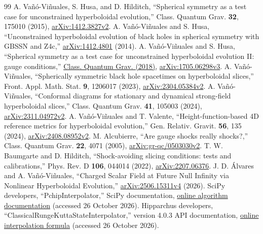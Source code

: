 \begin{thebibliography}{99}
A. Va\~n\'o-Vi\~nuales, S. Husa, and D. Hilditch,
``Spherical symmetry as a test case for unconstrained hyperboloidal evolution,''
Class. Quantum Grav. \textbf{32}, 175010 (2015),
\href{https://arxiv.org/abs/1412.3827v2}{arXiv:1412.3827v2}.
A. Va\~n\'o-Vi\~nuales and S. Husa,
``Unconstrained hyperboloidal evolution of black holes in spherical symmetry with GBSSN and Z4c,''
\href{https://arxiv.org/abs/1412.4801}{arXiv:1412.4801} (2014).
A. Va\~n\'o-Vi\~nuales and S. Husa,
``Spherical symmetry as a test case for unconstrained hyperboloidal evolution II: gauge conditions,''
\href{https://doi.org/10.1088/1361-6382/aaa4e2}{Class. Quantum Grav. (2018)},
\href{https://arxiv.org/abs/1705.06298v3}{arXiv:1705.06298v3}.
A. Va\~n\'o-Vi\~nuales,
``Spherically symmetric black hole spacetimes on hyperboloidal slices,''
Front. Appl. Math. Stat. \textbf{9}, 1206017 (2023),
\href{https://arxiv.org/abs/2304.05384v2}{arXiv:2304.05384v2}.
A. Va\~n\'o-Vi\~nuales,
``Conformal diagrams for stationary and dynamical strong-field hyperboloidal slices,''
Class. Quantum Grav. \textbf{41}, 105003 (2024),
\href{https://arxiv.org/abs/2311.04972v2}{arXiv:2311.04972v2}.
A. Va\~n\'o-Vi\~nuales and T. Valente,
``Height-function-based 4D reference metrics for hyperboloidal evolution,''
Gen. Relativ. Gravit. \textbf{56}, 135 (2024),
\href{https://arxiv.org/abs/2408.08952v2}{arXiv:2408.08952v2}.
M. Alcubierre,
``Are gauge shocks really shocks?,''
Class. Quantum Grav. \textbf{22}, 4071 (2005),
\href{https://arxiv.org/abs/gr-qc/0503030v2}{arXiv:gr-qc/0503030v2}.
T. W. Baumgarte and D. Hilditch,
``Shock-avoiding slicing conditions: tests and calibrations,''
Phys. Rev. D \textbf{106}, 044014 (2022),
\href{https://arxiv.org/abs/2207.06376}{arXiv:2207.06376}.
J. D. \'Alvares and A. Va\~n\'o-Vi\~nuales,
``Charged Scalar Field at Future Null Infinity via Nonlinear Hyperboloidal Evolution,''
\href{https://arxiv.org/abs/2506.15311v4}{arXiv:2506.15311v4} (2026).
SciPy developers, ``PchipInterpolator,'' SciPy documentation,
\href{https://docs.scipy.org/doc/scipy/reference/generated/scipy.interpolate.PchipInterpolator.html}{online algorithm documentation}
(accessed 26 October 2026).
Hipparchus developers, ``ClassicalRungeKuttaStateInterpolator,'' version 4.0.3 API documentation,
\href{https://hipparchus.org/apidocs-4.0.3/org/hipparchus/ode/nonstiff/interpolators/ClassicalRungeKuttaStateInterpolator.html}{online interpolation formula}
(accessed 26 October 2026).
\end{thebibliography}
